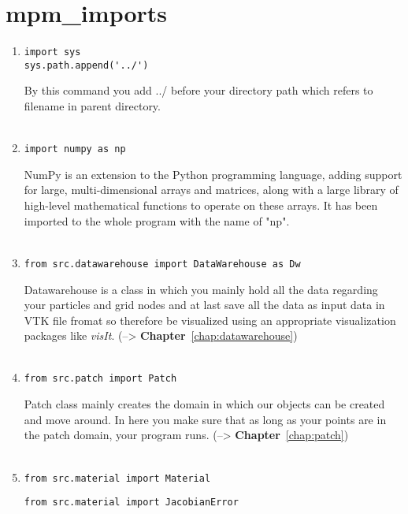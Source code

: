 \chapter{mpm\_imports}
\begin{enumerate}
\item 
\begin{lstlisting}
import sys
sys.path.append('../')
\end{lstlisting}
By this command you add ../ before your directory path which refers to filename in parent directory.\\ \\
\item 
\begin{lstlisting}
import numpy as np
\end{lstlisting}
NumPy is an extension to the Python programming language, adding support for large, multi-dimensional arrays and matrices, along with a large library of high-level mathematical functions to operate on these arrays. It has been imported to the whole program with the name of "np".\\ \\
\item 
\begin{lstlisting}
from src.datawarehouse import DataWarehouse as Dw
\end{lstlisting}
Datawarehouse is a class in which you mainly hold all the data regarding your particles and grid nodes and at last save all the data as input data in VTK file fromat so therefore be visualized using an appropriate visualization packages like \emph{visIt}. (--> \textbf{Chapter}~\ref{chap:datawarehouse})\\ \\
\item 
\begin{lstlisting}
from src.patch import Patch
\end{lstlisting}
Patch class mainly creates the domain in which our objects can be created and move around. In here you make sure that as long as your points are in the patch domain, your program runs. (--> \textbf{Chapter}~\ref{chap:patch})\\ \\
\item 
\begin{lstlisting}
from src.material import Material
\end{lstlisting}
\begin{lstlisting}
from src.material import JacobianError
\end{lstlisting}


\end{enumerate}
